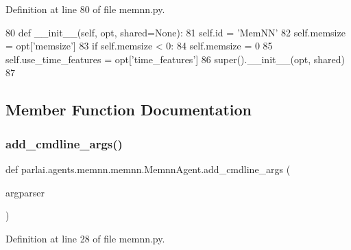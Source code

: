 Definition at line 80 of file memnn.\+py.


\begin{DoxyCode}
80     \textcolor{keyword}{def }\_\_init\_\_(self, opt, shared=None):
81         self.id = \textcolor{stringliteral}{'MemNN'}
82         self.memsize = opt[\textcolor{stringliteral}{'memsize'}]
83         \textcolor{keywordflow}{if} self.memsize < 0:
84             self.memsize = 0
85         self.use\_time\_features = opt[\textcolor{stringliteral}{'time\_features'}]
86         super().\_\_init\_\_(opt, shared)
87 
\end{DoxyCode}


\subsection{Member Function Documentation}
\mbox{\label{classparlai_1_1agents_1_1memnn_1_1memnn_1_1MemnnAgent_a25443d48c341d3f88a648c8273dfbf66}} 
\subsubsection{\texorpdfstring{add\+\_\+cmdline\+\_\+args()}{add\_cmdline\_args()}}
{\footnotesize\ttfamily def parlai.\+agents.\+memnn.\+memnn.\+Memnn\+Agent.\+add\+\_\+cmdline\+\_\+args (\begin{DoxyParamCaption}\item[{}]{argparser }\end{DoxyParamCaption})\hspace{0.3cm}{\ttfamily [static]}}



Definition at line 28 of file memnn.\+py.


